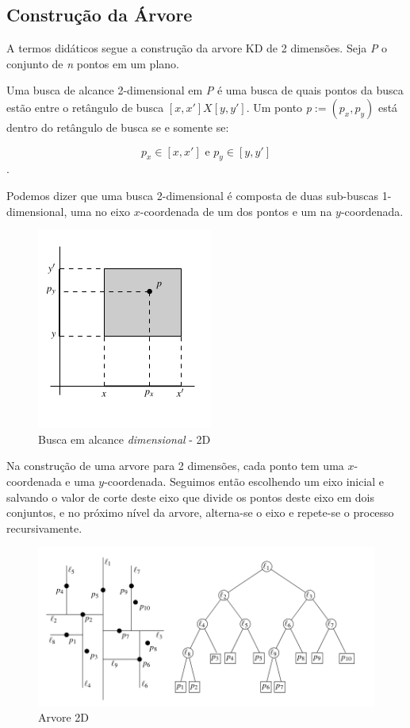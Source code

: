 \subsection{Construção da Árvore}
A termos didáticos segue a construção da arvore KD de 2 dimensões.
Seja \textit{P} o conjunto de \textit{n} pontos em um plano.

Uma busca de alcance 2-dimensional em \textit{P} é uma busca de quais pontos da busca estão
entre o retângulo de busca \([x,x'] X [y,y']\). Um ponto \textit{p}\(:= (p_x, p_y)\) está dentro do retângulo
de busca se e somente se:

\[
    p_x \in [x, x']  \text{ e } p_y \in [y,y']
\].

Podemos dizer que uma busca 2-dimensional é composta de duas sub-buscas 1-dimensional, uma no
eixo \(x\)-coordenada de um dos pontos e um na \(y\)-coordenada.

\begin{figure}[htb]
    \caption{\label{fig:Fig_2}Busca em alcance \textit{dimensional} - 2D}
    \begin{center}
        \includegraphics{images/search_range.png}
    \end{center}
\end{figure}

Na construção de uma arvore para 2 dimensões, cada ponto tem uma \(x\)-coordenada e uma
\(y\)-coordenada.
Seguimos então escolhendo um eixo inicial e salvando o valor de corte deste eixo que divide
os pontos deste eixo em dois conjuntos, e no próximo nível da arvore, alterna-se o eixo e repete-se
o processo recursivamente.


\begin{figure}[htb]
    \caption{\label{fig:Fig_3} Arvore 2D}
    \begin{center}
        \includegraphics{images/kd_tree1.png}
    \end{center}
\end{figure}


